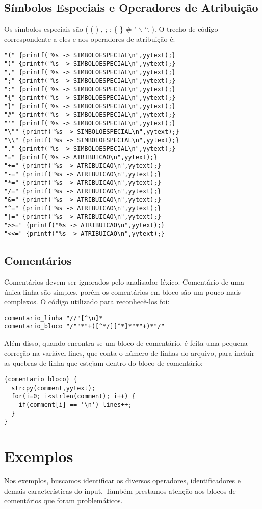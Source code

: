 \documentclass[a4paper,10pt]{article}
\begin{document}
  \subsection{Símbolos Especiais e Operadores de Atribuição}
  Os símbolos especiais são ( ( ) , ; : \{ \} \# ' $\backslash$ \textquotedblleft . ). O trecho de código correspondente a eles e aos operadores de atribuição é:
  \begin{verbatim}
"(" {printf("%s -> SIMBOLOESPECIAL\n",yytext);}
")" {printf("%s -> SIMBOLOESPECIAL\n",yytext);}
"," {printf("%s -> SIMBOLOESPECIAL\n",yytext);}
";" {printf("%s -> SIMBOLOESPECIAL\n",yytext);}
":" {printf("%s -> SIMBOLOESPECIAL\n",yytext);}
"{" {printf("%s -> SIMBOLOESPECIAL\n",yytext);}
"}" {printf("%s -> SIMBOLOESPECIAL\n",yytext);}
"#" {printf("%s -> SIMBOLOESPECIAL\n",yytext);}
"'" {printf("%s -> SIMBOLOESPECIAL\n",yytext);}
"\"" {printf("%s -> SIMBOLOESPECIAL\n",yytext);}
"\\" {printf("%s -> SIMBOLOESPECIAL\n",yytext);}
"." {printf("%s -> SIMBOLOESPECIAL\n",yytext);}
"=" {printf("%s -> ATRIBUICAO\n",yytext);}
"+=" {printf("%s -> ATRIBUICAO\n",yytext);}
"-=" {printf("%s -> ATRIBUICAO\n",yytext);}
"*=" {printf("%s -> ATRIBUICAO\n",yytext);}
"/=" {printf("%s -> ATRIBUICAO\n",yytext);}
"&=" {printf("%s -> ATRIBUICAO\n",yytext);}
"^=" {printf("%s -> ATRIBUICAO\n",yytext);}
"|=" {printf("%s -> ATRIBUICAO\n",yytext);}
">>=" {printf("%s -> ATRIBUICAO\n",yytext);}
"<<=" {printf("%s -> ATRIBUICAO\n",yytext);}

  \end{verbatim}

\subsection{Comentários}
  Comentários devem ser ignorados pelo analisador léxico. Comentário de uma única linha são simples, porém os comentários em bloco
  são um pouco mais complexos. O código utilizado para reconhecê-los foi:
  \begin{verbatim}
comentario_linha "//"[^\n]*
comentario_bloco "/""*"+([^*/][^*]*"*"+)*"/"
\end{verbatim}
Além disso, quando encontra-se um bloco de comentário, é feita uma pequena correção na variável lines, que conta o número de linhas
do arquivo, para incluir as quebras de linha que estejam dentro do bloco de comentário:
\begin{verbatim}
{comentario_bloco} {
  strcpy(comment,yytext);	
  for(i=0; i<strlen(comment); i++) {
    if(comment[i] == '\n') lines++;
  }
}
\end{verbatim}

\section{Exemplos}
Nos exemplos, buscamos identificar os diversos operadores, identificadores e demais características do input. Também prestamos atenção
aos blocos de comentários que foram problemáticos. 
\end{document}
